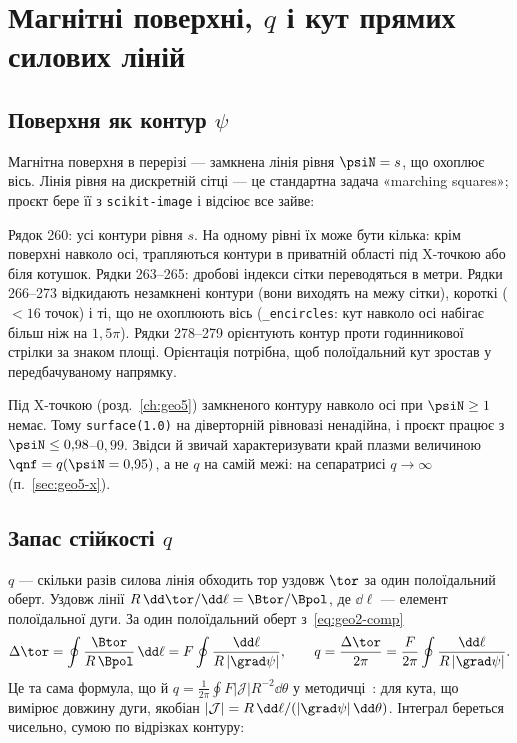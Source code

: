 \chapter{Магнітні поверхні, $q$ і кут прямих силових ліній}\label{ch:geo3}

\section{Поверхня як контур $\psi$}\label{sec:geo3-surf}

Магнітна поверхня в перерізі --- замкнена лінія рівня $\psiN=s$, що охоплює вісь. Лінія рівня на дискретній сітці --- це стандартна задача «marching squares»; проєкт бере її з \texttt{scikit-image} і відсіює все зайве:


\noindent Рядок 260: усі контури рівня $s$. На одному рівні їх може бути кілька: крім поверхні навколо осі, трапляються контури в приватній області під X-точкою або біля котушок. Рядки 263--265: дробові індекси сітки переводяться в метри. Рядки 266--273 відкидають незамкнені контури (вони виходять на межу сітки), короткі ($<16$ точок) і ті, що не охоплюють вісь (\texttt{\_encircles}: кут навколо осі набігає більш ніж на $1{,}5\pi$). Рядки 278--279 орієнтують контур проти годинникової стрілки за знаком площі. Орієнтація потрібна, щоб полоїдальний кут зростав у передбачуваному напрямку.

Під X-точкою (розд.~\ref{ch:geo5}) замкненого контуру навколо осі при $\psiN\ge1$ немає. Тому \texttt{surface(1.0)} на діверторній рівновазі ненадійна, і проєкт працює з $\psiN\le0{,}98$--$0{,}99$. Звідси й звичай характеризувати край плазми величиною $\qnf=q(\psiN=0{,}95)$, а не $q$ на самій межі: на сепаратрисі $q\to\infty$ (п.~\ref{sec:geo5-x}).

\section{Запас стійкості $q$}\label{sec:geo3-q}

$q$ --- скільки разів силова лінія обходить тор уздовж $\tor$ за один полоїдальний оберт. Уздовж лінії $R\,\dd\tor/\dd\ell=\Btor/\Bpol$, де $\dd\ell$ --- елемент полоїдальної дуги. За один полоїдальний оберт з~\eqref{eq:geo2-comp}
\begin{equation}\label{eq:geo3-q}
\Delta\tor=\oint\frac{\Btor}{R\,\Bpol}\,\dd\ell=F\oint\frac{\dd\ell}{R\,|\grad\psi|},\qquad q=\frac{\Delta\tor}{2\pi}=\frac{F}{2\pi}\oint\frac{\dd\ell}{R\,|\grad\psi|}.
\end{equation}
Це та сама формула, що й $q=\frac1{2\pi}\oint F|\mathcal{J}|R^{-2}\dd\theta$ у методичці~\cite[розд.~4, (4.1)]{Manual}: для кута, що вимірює довжину дуги, якобіан $|\mathcal{J}|=R\,\dd\ell/(|\grad\psi|\,\dd\theta)$. Інтеграл береться чисельно, сумою по відрізках контуру:

